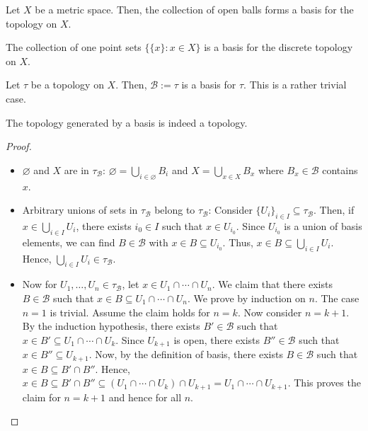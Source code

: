 \begin{example}
  Let $X$ be a metric space. Then, the collection of open balls forms a basis for the topology on $X$.
\end{example}

\begin{example}
  The collection of one point sets $\{ \{x\} : x\in X \}$ is a basis for the discrete topology on $X$.
\end{example}

\begin{example}
  Let ${\tau}$ be a topology on $X$. Then, $\mathcal{B}:={\tau}$ is a basis for ${\tau}$. This is a rather trivial case.
\end{example}

\begin{proposition}
  The topology generated by a basis is indeed a topology.
\end{proposition}
\begin{proof}
\begin{itemize}
  \item $\varnothing$ and $X$ are in ${\tau}_{\mathcal{B}}$: $\varnothing=\bigcup_{i\in\varnothing} B_i$ and $X=\bigcup_{x\in X} B_x$ where $B_x\in\mathcal{B}$ contains $x$.
  \item Arbitrary unions of sets in ${\tau}_{\mathcal{B}}$ belong to ${\tau}_{\mathcal{B}}$: Consider  $\{U_i\}_{i\in I}\subseteq{\tau}_{\mathcal{B}}$. Then, if $x\in \bigcup_{i\in I} U_i$, there exists $i_0\in I$ such that $x\in U_{i_0}$. Since $U_{i_0}$ is a union of basis elements, we can find $B\in\mathcal{B}$ with $x\in B\subseteq U_{i_0}$. Thus, $x\in B\subseteq \bigcup_{i\in I} U_i$. Hence, $\bigcup_{i\in I} U_i\in{\tau}_{\mathcal{B}}$.
  \item Now for $U_1,\ldots, U_n\in {\tau}_{\mathcal{B}}$, let $x\in U_1\cap\cdots\cap U_n$. We claim that there exists $B\in\mathcal{B}$ such that $x\in B\subseteq U_1\cap\cdots\cap U_n$. We prove by induction on $n$. The case $n=1$ is trivial. Assume the claim holds for $n=k$. Now consider $n=k+1$. By the induction hypothesis, there exists $B'\in\mathcal{B}$ such that $x\in B'\subseteq U_1\cap\cdots\cap U_k$. Since $U_{k+1}$ is open, there exists $B''\in\mathcal{B}$ such that $x\in B''\subseteq U_{k+1}$. Now, by the definition of basis, there exists $B\in\mathcal{B}$ such that $x\in B\subseteq B'\cap B''$. Hence, $x\in B\subseteq B'\cap B'' \subseteq (U_1\cap\cdots\cap U_k)\cap U_{k+1}=U_1\cap\cdots\cap U_{k+1}$. This proves the claim for $n=k+1$ and hence for all $n$.
\end{itemize}  
\end{proof}

